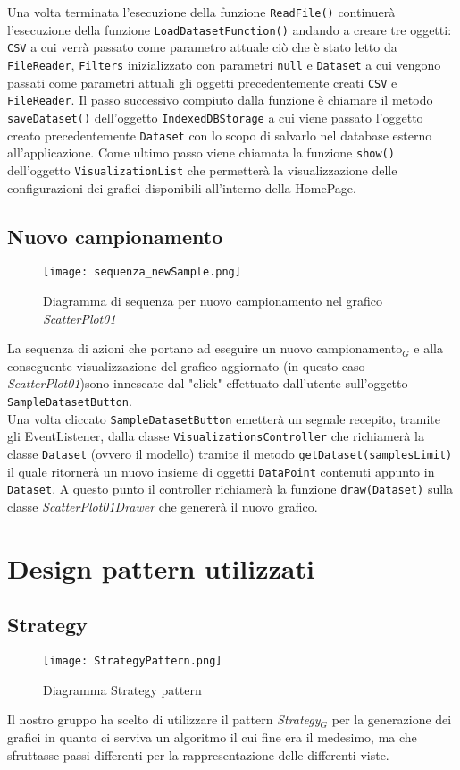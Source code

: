Una volta terminata l'esecuzione della funzione \texttt{ReadFile()} continuerà l'esecuzione della funzione \texttt{LoadDatasetFunction()} andando a creare tre oggetti:
\texttt{CSV} a cui verrà passato come parametro attuale ciò che è stato letto da \texttt{FileReader}, \texttt{Filters} inizializzato con parametri \texttt{null} e \texttt{Dataset} a cui vengono passati come parametri attuali gli oggetti precedentemente creati \texttt{CSV} e \texttt{FileReader}.
Il passo successivo compiuto dalla funzione è chiamare il metodo \texttt{saveDataset()} dell'oggetto \texttt{IndexedDBStorage} a cui viene passato l'oggetto creato precedentemente \texttt{Dataset} con lo scopo di salvarlo nel database esterno all'applicazione.
Come ultimo passo viene chiamata la funzione \texttt{show()} dell'oggetto \texttt{VisualizationList} che permetterà la visualizzazione delle configurazioni dei grafici disponibili all'interno della HomePage.

\subsection{Nuovo campionamento}
\begin{figure}[H]
    \texttt{[image: sequenza\_newSample.png]}
    \caption{Diagramma di sequenza per nuovo campionamento nel grafico \textit{ScatterPlot01}}
\end{figure}
La sequenza di azioni che portano ad eseguire un nuovo campionamento$_G$ e alla conseguente visualizzazione del grafico aggiornato (in questo caso \textit{ScatterPlot01})sono innescate dal "click" effettuato dall'utente sull'oggetto \texttt{SampleDatasetButton}.\\
Una volta cliccato \texttt{SampleDatasetButton} emetterà un segnale recepito, tramite gli EventListener, dalla classe \texttt{VisualizationsController} che richiamerà la classe \texttt{Dataset} (ovvero il modello) tramite il metodo \texttt{getDataset(samplesLimit)} il quale ritornerà un nuovo insieme di oggetti \texttt{DataPoint} contenuti appunto in \texttt{Dataset}. A questo punto il controller richiamerà la funzione \texttt{draw(Dataset)} sulla classe \textit{ScatterPlot01Drawer} che genererà il nuovo grafico.


\section{Design pattern utilizzati}
\subsection{Strategy}
\begin{figure}[H]
	\centering
	\texttt{[image: StrategyPattern.png]}
	\caption{Diagramma Strategy pattern}
  \end{figure}
Il nostro gruppo ha scelto di utilizzare il pattern \textit{Strategy}$_G$ per la generazione dei grafici in quanto ci serviva un algoritmo il cui fine era il medesimo, ma che sfruttasse passi differenti per la rappresentazione delle differenti viste.

